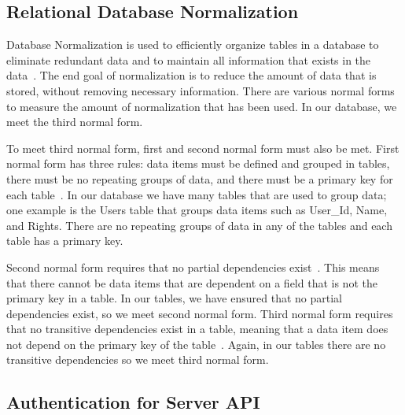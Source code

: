 \documentclass[12pt]{report}
\let\Oldsubsection\subsection
\renewcommand{\subsection}{\FloatBarrier\Oldsubsection}
\begin{document}
\subsection{Relational Database Normalization} \label{relational-database-normalization}


Database Normalization is used to efficiently organize tables in a database to eliminate redundant
data and to maintain all information that exists in the data~\autocite{DBNORMALIZATION}.
The end goal of normalization is to
reduce the amount of data that is stored, without removing necessary information. There are various
normal forms to measure the amount of normalization that has been used. In our database, we meet
the third normal form.

To meet third normal form, first and second normal form must also be met. First normal form
has three rules: data items must be defined and grouped in tables, there must be no repeating
groups of data, and there must be a primary key for each table~\autocite{FIRSTNORMALFORM}.
In our database we have many tables
that are used to group data; one example is the Users table that groups data items such as User\_Id,
Name, and Rights. There are no repeating groups of data in any of the tables and each table has a
primary key.

Second normal form requires that no partial dependencies exist~\autocite{SECONDNORMALFORM}. This means that there
cannot be data items that are dependent on a field that is not the primary key in a table. In our
tables, we have ensured that no partial dependencies exist, so we meet second normal form.
Third normal form requires that no transitive dependencies exist in a table, meaning that a data item
does not depend on the primary key of the table~\autocite{THIRDNORMALFORM}. Again, in our tables there
are no transitive dependencies so we meet third normal form.

\subsection{Authentication for Server API} \label{authentication-for-server-api}

\end{document}

